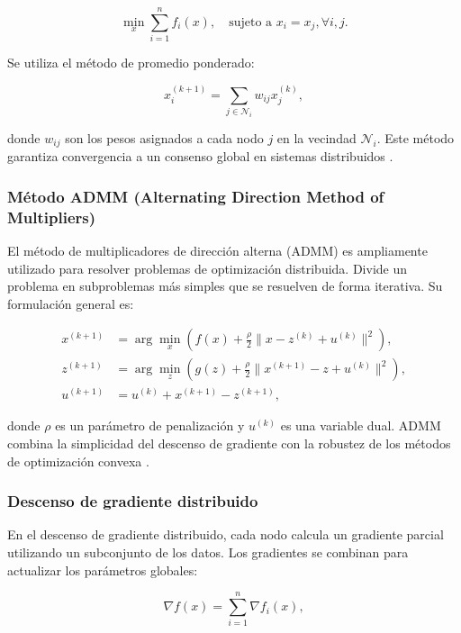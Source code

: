 \begin{itemize}
		\begin{equation}
			\min_x \sum_{i=1}^n f_i(x), \quad \text{sujeto a } x_i = x_j, \forall i, j.
		\end{equation}
		
		Se utiliza el método de promedio ponderado:
		
		\begin{equation}
			x_i^{(k+1)} = \sum_{j \in \mathcal{N}_i} w_{ij} x_j^{(k)},
		\end{equation}
		
		donde \(w_{ij}\) son los pesos asignados a cada nodo \(j\) en la vecindad \(\mathcal{N}_i\). Este método garantiza convergencia a un consenso global en sistemas distribuidos \cite{boyd2011distributed}.
		
		\subsubsection{Método ADMM (Alternating Direction Method of Multipliers)}
		
		El método de multiplicadores de dirección alterna (ADMM) es ampliamente utilizado para resolver problemas de optimización distribuida. Divide un problema en subproblemas más simples que se resuelven de forma iterativa. Su formulación general es:
		
		\begin{align}
			x^{(k+1)} &= \arg \min_x \left( f(x) + \frac{\rho}{2} \|x - z^{(k)} + u^{(k)}\|^2 \right), \\
			z^{(k+1)} &= \arg \min_z \left( g(z) + \frac{\rho}{2} \|x^{(k+1)} - z + u^{(k)}\|^2 \right), \\
			u^{(k+1)} &= u^{(k)} + x^{(k+1)} - z^{(k+1)},
		\end{align}
		
		donde \(\rho\) es un parámetro de penalización y \(u^{(k)}\) es una variable dual. ADMM combina la simplicidad del descenso de gradiente con la robustez de los métodos de optimización convexa \cite{boyd2011admm}.
		
		\subsubsection{Descenso de gradiente distribuido}
		
		En el descenso de gradiente distribuido, cada nodo calcula un gradiente parcial utilizando un subconjunto de los datos. Los gradientes se combinan para actualizar los parámetros globales:
		
		\begin{equation}
			\nabla f(x) = \sum_{i=1}^n \nabla f_i(x),
		\end{equation}
		

\end{itemize}
